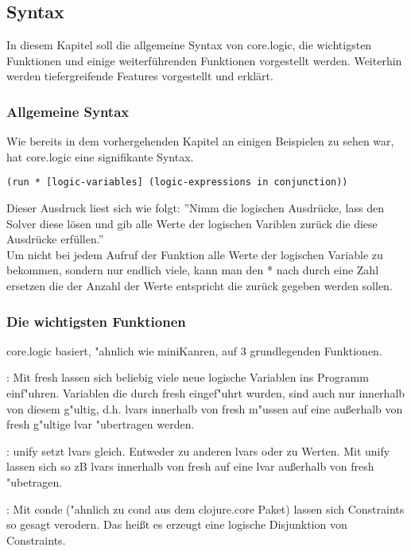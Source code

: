 \subsection{Syntax}

In diesem Kapitel soll die allgemeine Syntax von core.logic, die wichtigsten Funktionen und einige weiterführenden Funktionen vorgestellt werden. Weiterhin werden tiefergreifende Features vorgestellt und erklärt.

\subsubsection{Allgemeine Syntax}

Wie bereits in dem vorhergehenden Kapitel an einigen Beispielen zu sehen war, hat core.logic eine signifikante Syntax.
\begin{lstlisting}
(run * [logic-variables] (logic-expressions in conjunction))
\end{lstlisting}
Dieser Ausdruck liest sich wie folgt: ''Nimm die logischen Ausdrücke, lass den Solver diese lösen und gib alle Werte der logischen Variblen zurück die diese Ausdrücke erfüllen.''\\

Um nicht bei jedem Aufruf der  Funktion alle Werte der logischen Variable zu bekommen, sondern nur endlich viele, kann man den * nach  durch eine Zahl ersetzen die der Anzahl der Werte entspricht die zurück gegeben werden sollen.

\subsubsection{Die wichtigsten Funktionen}

core.logic basiert, "ahnlich wie miniKanren, auf 3 grundlegenden Funktionen.
\begin{description}
\item{:}
Mit fresh lassen sich beliebig viele neue logische Variablen ins Programm einf"uhren. Variablen die durch fresh eingef"uhrt wurden, sind auch nur innerhalb von diesem g"ultig, d.h. lvars innerhalb von fresh m"ussen auf eine au\ss{}erhalb von fresh g"ultige lvar "ubertragen werden.

\item{:}
unify setzt lvars gleich. Entweder zu anderen lvars oder zu Werten. Mit unify lassen sich so zB lvars innerhalb von fresh auf eine lvar au\ss{}erhalb von fresh "ubetragen.

\item{:}
Mit conde ("ahnlich zu cond aus dem clojure.core Paket) lassen sich Constraints so gesagt \dq{}verodern\dq{}. Das heißt es erzeugt eine logische Disjunktion von Constraints.
\end{description}

